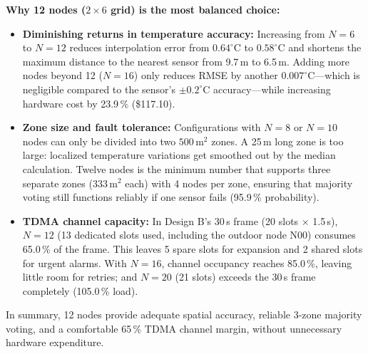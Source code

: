 \documentclass[11pt,a4paper]{report}
\begin{document}
\textbf{Why 12 nodes ($2\times6$ grid) is the most balanced choice:}
\begin{itemize}
  \item \textbf{Diminishing returns in temperature accuracy:} Increasing from $N=6$ to $N=12$ reduces interpolation error from $0.64^\circ\text{C}$ to $0.58^\circ\text{C}$ and shortens the maximum distance to the nearest sensor from 9.7\,m to 6.5\,m. Adding more nodes beyond 12 ($N=16$) only reduces RMSE by another $0.007^\circ\text{C}$---which is negligible compared to the sensor's $\pm 0.2^\circ\text{C}$ accuracy---while increasing hardware cost by 23.9\,\% (\$117.10).
  \item \textbf{Zone size and fault tolerance:} Configurations with $N=8$ or $N=10$ nodes can only be divided into two $500\,\text{m}^2$ zones. A 25\,m long zone is too large: localized temperature variations get smoothed out by the median calculation. Twelve nodes is the minimum number that supports three separate zones ($333\,\text{m}^2$ each) with 4 nodes per zone, ensuring that majority voting still functions reliably if one sensor fails (95.9\,\% probability).
  \item \textbf{TDMA channel capacity:} In Design B's 30\,s frame (20 slots $\times$ 1.5\,s), $N=12$ (13 dedicated slots used, including the outdoor node N00) consumes 65.0\,\% of the frame. This leaves 5 spare slots for expansion and 2 shared slots for urgent alarms. With $N=16$, channel occupancy reaches 85.0\,\%, leaving little room for retries; and $N=20$ (21 slots) exceeds the 30\,s frame completely (105.0\,\% load).
\end{itemize}
In summary, 12 nodes provide adequate spatial accuracy, reliable 3-zone majority voting, and a comfortable 65\,\% TDMA channel margin, without unnecessary hardware expenditure.
\end{document}
